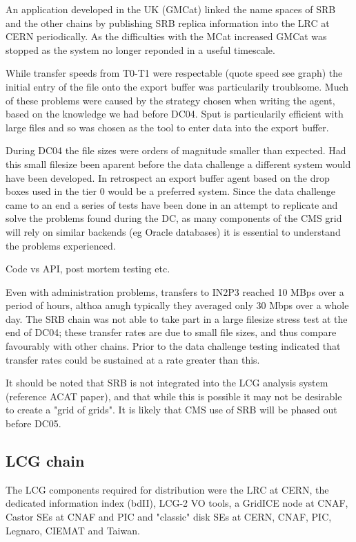 \documentclass{cmspaper}
\begin{document}
An application developed in the UK (GMCat) linked the name spaces of SRB
and the other 
chains by publishing SRB replica information into the LRC at CERN
periodically. As the
difficulties with the MCat increased GMCat was stopped as the system no
longer reponded 
in a useful timescale. 

While transfer speeds from T0-T1 were respectable (quote speed see
graph) the initial 
entry of the file onto the export buffer was particularily troublsome.
Much of these 
problems were caused by the strategy chosen when writing the agent,
based on the 
knowledge we had before DC04. Sput is particularily efficient with large
files 
and so was chosen as the tool to enter data into the export buffer. 

During DC04 the file sizes were orders of magnitude smaller than
expected. Had this small 
filesize been aparent before the data challenge a different system would
have been 
developed. In retrospect an export buffer agent based on the drop boxes
used in the 
tier 0 would be a preferred system. Since the data challenge came to an
end a series of
tests have been done in an attempt to replicate and solve the problems
found during 
the DC, as many components of the CMS grid will rely on similar backends
(eg Oracle 
databases) it is essential to understand the problems experienced.


Code vs API, post mortem testing etc.

Even with administration problems, transfers to IN2P3 reached 10 MBps
over a period 
of hours, althoa anugh typically they averaged only 30 Mbps over a whole
day. The SRB 
chain was not able to take part in a large filesize stress test at the
end of DC04; 
these transfer rates are due to small file sizes, and thus compare
favourably with 
other chains. Prior to the data challenge testing indicated that
transfer rates could
be sustained at a rate greater than this.

It should be noted that SRB is not integrated into the LCG analysis
system (reference 
ACAT paper), and that while this is possible it may not be desirable to
create a "grid 
of grids". It is likely that CMS use of SRB will be phased out before
DC05.

\subsection{LCG chain}
The LCG components required for distribution were the LRC at CERN, the dedicated information index (bdII), LCG-2 VO tools, a GridICE node at CNAF, Castor SEs at CNAF and PIC and "classic" disk SEs at CERN, CNAF, PIC, Legnaro, CIEMAT and Taiwan.
\end{document}
